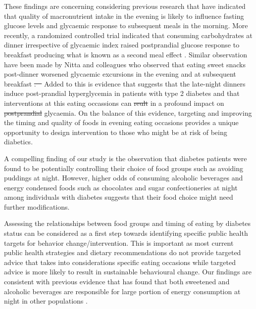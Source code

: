 \documentclass{bmcart}
\providecommand{\DIFadd}[1]{{\protect\color{blue}\uwave{#1}}} %
\providecommand{\DIFdel}[1]{{\protect\color{red}\sout{#1}}}                      %
\providecommand{\DIFaddbegin}{} %
\providecommand{\DIFaddend}{} %
\providecommand{\DIFdelbegin}{} %
\providecommand{\DIFdelend}{} %
\begin{document}
These findings are concerning considering previous research that have indicated that quality of macronutrient intake in the evening is likely to influence fasting glucose levels and glycaemic response to subsequent meals in the morning. \cite{Wolever1988} More recently, a randomized controlled trial indicated that consuming carbohydrates at dinner irrespective of glycaemic index raised postprandial glucose response to breakfast producing what is known as a second meal effect \cite{Haldar2020}. Similar observation have been made by Nitta and colleagues who observed that eating sweet snacks post-dinner worsened glycaemic excursions in the evening and at subsequent breakfast \DIFdelbegin \DIFdel{. \mbox{%
\cite{Nitta2019}}\hspace{0pt}%
}\DIFdelend \DIFaddbegin \DIFadd{\mbox{%
\cite{Nitta2019}}\hspace{0pt}%
. }\DIFaddend Added to this is evidence that suggests that the late-night dinners induce post-prandial hyperglycemia in patients with type 2 diabetes and that interventions at this eating occassions can \DIFdelbegin \DIFdel{reult }\DIFdelend \DIFaddbegin \DIFadd{result }\DIFaddend in a profound impact on \DIFdelbegin \DIFdel{postprandial }\DIFdelend \DIFaddbegin \DIFadd{post-prandial }\DIFaddend glycaemia. On the balance of this evidence, targeting and improving the timing and quality of foods in evening eating occasions provides a unique opportunity to design intervention to those who might be at risk of being diabetics. 


A compelling finding of our study is the observation that diabetes patients were found to be potentially controlling their choice of food groups such as avoiding puddings at night. However, higher odds of consuming alcoholic beverages and energy condensed foods such as chocolates and sugar confectioneries at night among individuals with diabetes suggests that their food choice might need further modifications. 

Assessing the relationships between food groups and timing of eating by diabetes status can be considered as a first step towards identifying specific public health targets for behavior change/intervention. This is important as most current public health strategies and dietary recommendations do not provide targeted advice that takes into considerations specific eating occasions while targeted advice is more likely to result in sustainable behavioural change. Our findings are consistent with previous evidence that has found that both sweetened and alcoholic beverages are responsible for large portion of energy consumption at night in other populations \cite{Hassen2018}. 
\end{document}
